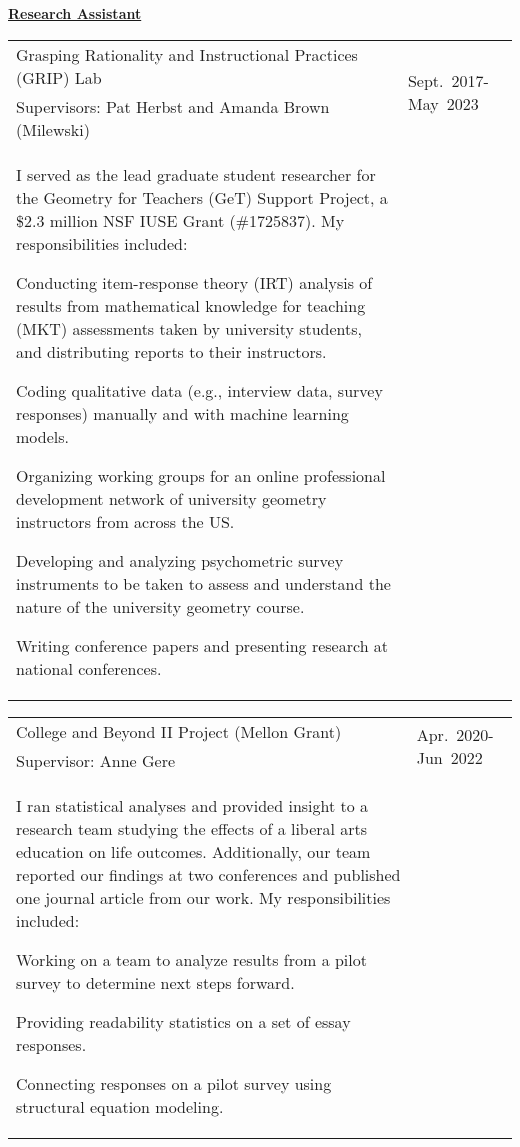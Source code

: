 \documentclass[margin,line]{res}
\newenvironment{list1}{
  \begin{list}{\ding{113}}{%
      \setlength{\itemsep}{0in}
      \setlength{\parsep}{0in} \setlength{\parskip}{0in}
      \setlength{\topsep}{0in} \setlength{\partopsep}{0in}
      \setlength{\leftmargin}{0.17in}}}{\end{list}}
\renewcommand{\subsection}[1]{%
      \par\vspace{3pt}%
      \underline{\normalsize\bfseries #1}%
      \par\vspace{3pt}%
    }
\begin{document}
\begin{resume}
\subsection{\sc Research Assistant}
\begin{tabular}{@{}p{4.0in}p{1.0in}}
Grasping Rationality and Instructional Practices (GRIP) Lab  & \multirow{2}{1.0in}{Sept.~2017-May~2023}\\
Supervisors: Pat Herbst and Amanda Brown (Milewski) \\
I served as the lead graduate student researcher for the Geometry for Teachers (GeT) Support Project, a \$2.3 million NSF IUSE Grant (\#1725837). My responsibilities included:
\begin{list1}
\item Conducting item-response theory (IRT) analysis of results from mathematical knowledge for teaching (MKT) assessments taken by university students, and distributing reports to their instructors.
\item Coding qualitative data (e.g., interview data, survey responses) manually and with machine learning models.
\item Organizing working groups for an online professional development network of university geometry instructors from across the US.
\item Developing and analyzing psychometric survey instruments to be taken to assess and understand the nature of the university geometry course.
\item Writing conference papers and presenting research at national conferences.
\end{list1}
\end{tabular}
\vspace{0.3cm}
\begin{tabular}{@{}p{4.0in}p{1.0in}}
  College and Beyond II Project (Mellon Grant)  & \multirow{2}{1in}{Apr.~2020-Jun~2022}\\
Supervisor: Anne Gere \\
I ran statistical analyses and provided insight to a research team studying the effects of a liberal arts education on life outcomes. Additionally, our team reported our findings at two conferences and published one journal article from our work. My responsibilities included:
\begin{list1}
  \item Working on a team to analyze results from a pilot survey to determine next steps forward.
  \item Providing readability statistics on a set of essay responses.
  \item Connecting responses on a pilot survey using structural equation modeling.
\end{list1}
\end{tabular}


\end{resume}
\end{document}
